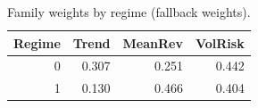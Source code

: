 \begin{table}[t]
\centering
\caption{Family weights by regime (fallback weights).}
\label{tab:family_weights_regime}
\begin{tabular}{rrrr}
\toprule
Regime & Trend & MeanRev & VolRisk \\
\midrule
0 & 0.307 & 0.251 & 0.442 \\
1 & 0.130 & 0.466 & 0.404 \\
\bottomrule
\end{tabular}

\end{table}
